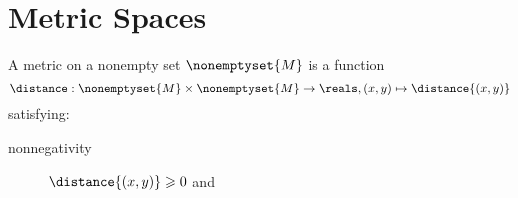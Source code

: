 \section{Metric Spaces}\label{sec:metric-spaces}

\begin{definition}
  A metric on a nonempty set \(\nonemptyset{M}\) is a function
  \[
    \distance:\nonemptyset{M}\times\nonemptyset{M}\to\reals,
    (x,y)\mapsto\distance{(x,y)}
  \]
  satisfying:
  \begin{description}
    \item[nonnegativity]
      \(\distance{(x,y)}\geqslant{0}\) and
  \end{description}
\end{definition}
